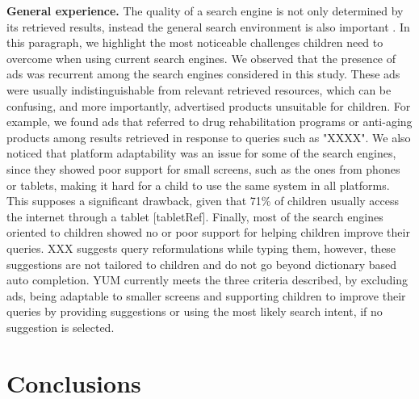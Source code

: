 \documentclass{sig-alternate-05-2015}
\begin{document}
\noindent
\textbf{General experience.} The quality of a search engine is not only determined by its retrieved results, instead the general search environment is also important   . In this paragraph, we highlight the most noticeable challenges children need to overcome when using current search engines. We observed that the presence of ads was recurrent among the search engines considered in this study. These ads were usually indistinguishable from relevant retrieved resources, which can be confusing, and more importantly, advertised products unsuitable for children. For example, we found ads that referred to drug rehabilitation programs or anti-aging products among results retrieved in response to queries such as "XXXX". We also noticed that platform adaptability was an issue for some of the search engines, since they showed poor support for small screens, such as the ones from phones or tablets, making it hard for a child to use the same system in all platforms. This supposes a significant drawback, given that 71\% of children usually access the internet through a tablet [tabletRef]. Finally, most of the search engines oriented to children showed no or poor support for helping children improve their queries. XXX  suggests query reformulations while typing them, however, these suggestions are not tailored to children and do not go beyond dictionary based auto completion. YUM currently meets the three criteria described, by excluding ads, being adaptable to smaller screens and supporting children to improve their queries by providing suggestions or using the most likely search intent, if no suggestion is selected.



\section{Conclusions}
\end{document}
